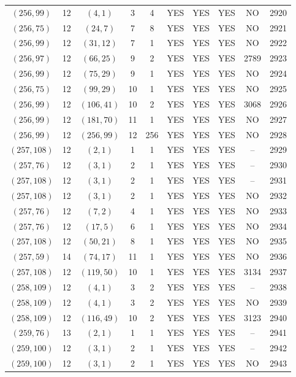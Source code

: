 \begin{longtable}{|c|c|c|c|c|c|c|c|c|c|}
$(256, 99)$ & 12 & $(4, 1)$ & 3 & 4 & YES & YES & YES & NO & 2920\\
$(256, 75)$ & 12 & $(24, 7)$ & 7 & 8 & YES & YES & YES & NO & 2921\\
$(256, 99)$ & 12 & $(31, 12)$ & 7 & 1 & YES & YES & YES & NO & 2922\\
$(256, 97)$ & 12 & $(66, 25)$ & 9 & 2 & YES & YES & YES & 2789 & 2923\\
$(256, 99)$ & 12 & $(75, 29)$ & 9 & 1 & YES & YES & YES & NO & 2924\\
$(256, 75)$ & 12 & $(99, 29)$ & 10 & 1 & YES & YES & YES & NO & 2925\\
$(256, 99)$ & 12 & $(106, 41)$ & 10 & 2 & YES & YES & YES & 3068 & 2926\\
$(256, 99)$ & 12 & $(181, 70)$ & 11 & 1 & YES & YES & YES & NO & 2927\\
$(256, 99)$ & 12 & $(256, 99)$ & 12 & 256 & YES & YES & YES & NO & 2928\\
$(257, 108)$ & 12 & $(2, 1)$ & 1 & 1 & YES & YES & YES & -- & 2929\\
$(257, 76)$ & 12 & $(3, 1)$ & 2 & 1 & YES & YES & YES & -- & 2930\\
$(257, 108)$ & 12 & $(3, 1)$ & 2 & 1 & YES & YES & YES & -- & 2931\\
$(257, 108)$ & 12 & $(3, 1)$ & 2 & 1 & YES & YES & YES & NO & 2932\\
$(257, 76)$ & 12 & $(7, 2)$ & 4 & 1 & YES & YES & YES & NO & 2933\\
$(257, 76)$ & 12 & $(17, 5)$ & 6 & 1 & YES & YES & YES & NO & 2934\\
$(257, 108)$ & 12 & $(50, 21)$ & 8 & 1 & YES & YES & YES & NO & 2935\\
$(257, 59)$ & 14 & $(74, 17)$ & 11 & 1 & YES & YES & YES & NO & 2936\\
$(257, 108)$ & 12 & $(119, 50)$ & 10 & 1 & YES & YES & YES & 3134 & 2937\\
$(258, 109)$ & 12 & $(4, 1)$ & 3 & 2 & YES & YES & YES & -- & 2938\\
$(258, 109)$ & 12 & $(4, 1)$ & 3 & 2 & YES & YES & YES & NO & 2939\\
$(258, 109)$ & 12 & $(116, 49)$ & 10 & 2 & YES & YES & YES & 3123 & 2940\\
$(259, 76)$ & 13 & $(2, 1)$ & 1 & 1 & YES & YES & YES & -- & 2941\\
$(259, 100)$ & 12 & $(3, 1)$ & 2 & 1 & YES & YES & YES & -- & 2942\\
$(259, 100)$ & 12 & $(3, 1)$ & 2 & 1 & YES & YES & YES & NO & 2943\\

\end{longtable}
